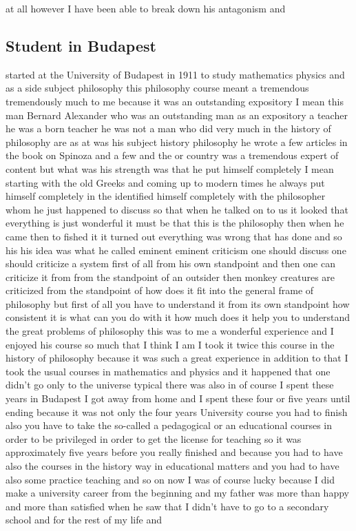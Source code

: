 \documentclass{article}
\begin{document}
at all however I have been able to break down his antagonism and

\subsection{Student in Budapest}
started at the University of Budapest in 1911 to study mathematics physics and as a side subject philosophy this philosophy course meant a tremendous tremendously much to me because it was an outstanding expository I mean this man Bernard Alexander who was an outstanding man as an expository a teacher he was a born teacher he was not a man who did very much in the history of philosophy are as at was his subject history philosophy he wrote a few articles in the book on Spinoza and a few and the or country was a tremendous expert of content but what was his strength was that he put himself completely I mean starting with the old Greeks and coming up to modern times he always put himself completely in the identified himself completely with the philosopher whom he just happened to discuss so that when he talked on to us it looked that everything is just wonderful it must be that this is the philosophy then when he came then to fished it it turned out everything was wrong that has done and so his his idea was what he called eminent eminent criticism one should discuss one should criticize a system first of all from his own standpoint and then one can criticize it from from the standpoint of an outsider then monkey creatures are criticized from the standpoint of how does it fit into the general frame of philosophy but first of all you have to understand it from its own standpoint how consistent it is what can you do with it how much does it help you to understand the great problems of philosophy this was to me a wonderful experience and I enjoyed his course so much that I think I am I took it twice this course in the history of philosophy because it was such a great experience in addition to that I took the usual courses in mathematics and physics and it happened that one didn't go only to the universe typical there was also in of course I spent these years in Budapest I got away from home and I spent these four or five years until ending because it was not only the four years University course you had to finish also you have to take the so-called a pedagogical or an educational courses in order to be privileged in order to get the license for teaching so it was approximately five years before you really finished and because you had to have also the courses in the history way in educational matters and you had to have also some practice teaching and so on now I was of course lucky because I did make a university career from the beginning and my father was more than happy and more than satisfied when he saw that I didn't have to go to a secondary school and for the rest of my life and
\end{document}
